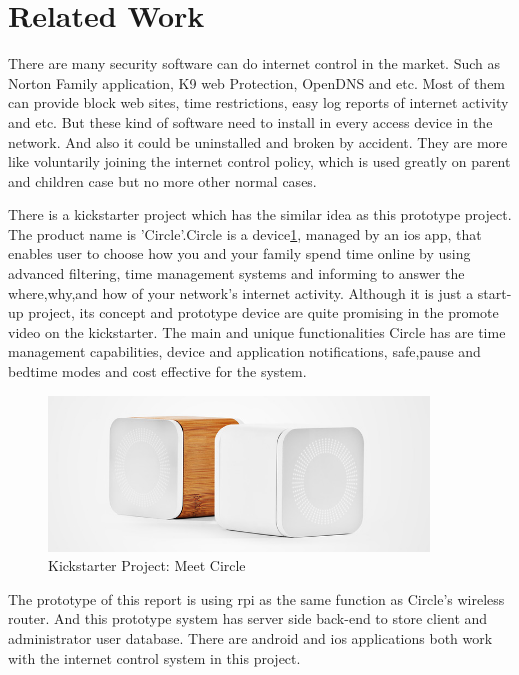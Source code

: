 \section{Related Work}
\par There are many security software can do internet control in the market. Such as Norton Family application\cite{Norton}, K9 web Protection\cite{K9}, OpenDNS\cite{OpenDNS} and etc. Most of them can provide block web sites, time restrictions, easy log reports of internet activity and etc. But these kind of software need to install in every access device in the network. And also it could be uninstalled and broken by accident. They are more like voluntarily joining the internet control policy, which is used greatly on parent and children case but no more other normal cases.
\par There is a kickstarter\cite{kickstarterCircle} project which has the similar idea as this prototype project. The product name is 'Circle'\cite{Circle}.Circle is a device\ref{fig:circle_project}, managed by an \gls{ios} app, that enables user to choose how you and your family spend time online by using advanced filtering, time management systems and informing to answer the where,why,and how of your network's internet activity. Although it is just a start-up project, its concept and prototype device are quite promising in the promote video on the kickstarter. The main and unique functionalities Circle has are time management capabilities, device and application notifications, safe,pause and bedtime modes and cost effective for the system. 
\begin{figure}
	\centering
    	\includegraphics[width=0.90\textwidth]{figs/circleDevice.jpg}
  	\caption{Kickstarter Project: Meet Circle}
  	\label{fig:circle_project}
\end{figure}
\par The prototype of this report is using \gls{rpi} as the same function as Circle's wireless router. And this prototype system has server side back-end to store client and administrator user database. There are android and \gls{ios} applications both work with the internet control system in this project.
